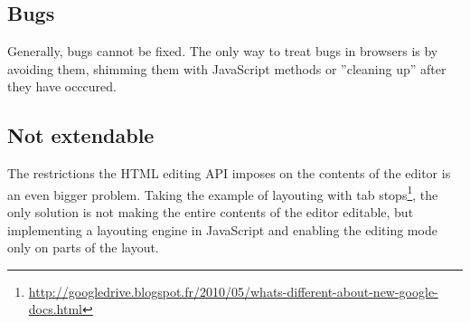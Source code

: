\subsection{Bugs}

Generally, bugs cannot be fixed. The only way to treat bugs in browsers is by avoiding them, shimming them with JavaScript methods or ''cleaning up'' after they have occcured.

\subsection{Not extendable}
\label{subsec:treating_issues_last}

The restrictions the HTML editing API imposes on the contents of the editor is an even bigger problem. Taking the example of layouting with tab stops\footnote{\url{http://googledrive.blogspot.fr/2010/05/whats-different-about-new-google-docs.html}}, the only solution is not making the entire contents of the editor editable, but implementing a layouting engine in JavaScript and enabling the editing mode only on parts of the layout.




